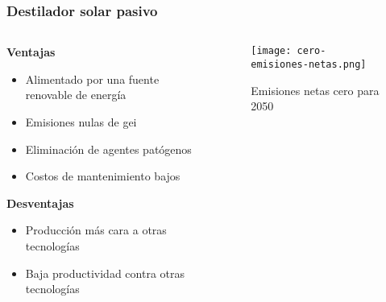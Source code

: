 \begin{frame}
    \frametitle{Destilador solar pasivo}
    \begin{columns}
        \begin{column}{0.5\textwidth}
            \textbf{\large Ventajas}
            
            \begin{itemize}
                \item Alimentado por una fuente renovable de energía
                \item Emisiones nulas de \acrfull{gei}
                \item Eliminación de agentes patógenos
                \item Costos de mantenimiento bajos
            \end{itemize}
            \vspace*{3mm}
            \textbf{\large Desventajas}
            
            \begin{itemize}
                \item Producción más cara a otras tecnologías
                \item Baja productividad contra otras tecnologías
            \end{itemize}
        \end{column}
        
        \begin{column}{0.5\textwidth}
            \centering
            \begin{figure}
                \centering
                \texttt{[image: cero-emisiones-netas.png]}
                \caption{Emisiones netas cero para 2050}
            \end{figure}
        \end{column}
    \end{columns}
\end{frame}
